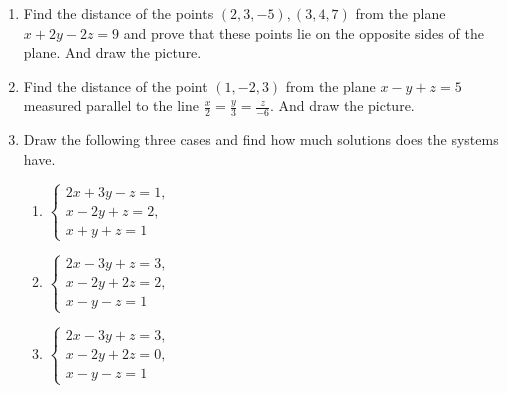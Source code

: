 \documentclass[a4paper,10pt]{article}
\begin{document}
\begin{enumerate}
\item %
Find the distance of the points $(2, 3, -5), (3, 4, 7)$ from the plane $x + 2y - 2z = 9$ and prove that these points lie on the opposite sides of the plane. And draw the picture.

\item %
Find the distance of the point $(1, -2, 3)$ from the plane $x - y + z = 5$ measured parallel to the line $\frac{x}{2} = \frac{y}{3} = \frac{z}{-6}$. And draw the picture.

\item
Draw the following three cases and find how much solutions does the systems have.
\begin{enumerate}
\item
$
\begin{cases}
2x + 3y - z = 1, \\
x - 2y + z = 2, \\
x + y + z = 1
\end{cases}
$

\item
$
\begin{cases}
2x - 3y + z = 3, \\
x - 2y + 2z = 2, \\
x - y - z = 1
\end{cases}
$

\item
$
\begin{cases}
2x - 3y + z = 3, \\
x - 2y + 2z = 0, \\
x - y - z = 1
\end{cases}
$

\end{enumerate}


\end{enumerate}
\end{document}
